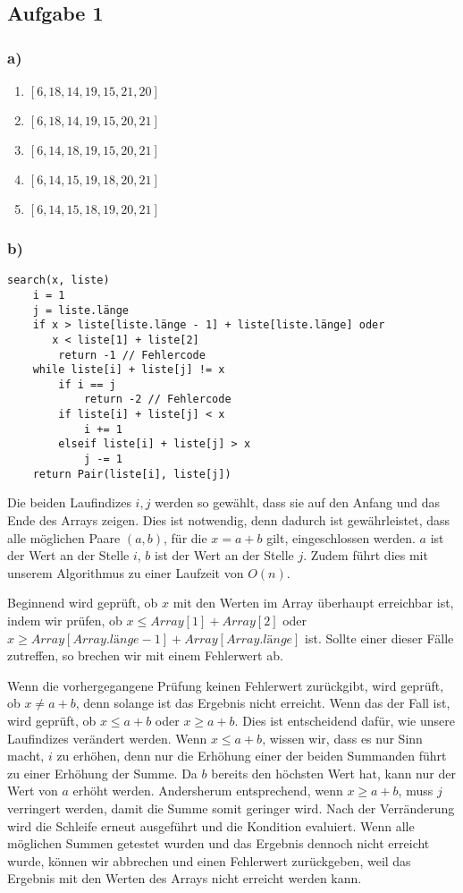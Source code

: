 \documentclass[a4paper,fleqn]{scrartcl}
\begin{document}
\subsection*{Aufgabe 1}
\subsubsection*{a)}
\begin{enumerate}
\item \([6, 18, 14, 19, 15, 21, 20]\)
\item \([6, 18, 14, 19, 15, 20, 21]\)
\item \([6, 14, 18, 19, 15, 20, 21]\)
\item \([6, 14, 15, 19, 18, 20, 21]\)
\item \([6, 14, 15, 18, 19, 20, 21]\)
\end{enumerate}

\subsubsection*{b)}
\begin{verbatim}
search(x, liste)
    i = 1
    j = liste.länge
    if x > liste[liste.länge - 1] + liste[liste.länge] oder
       x < liste[1] + liste[2]
        return -1 // Fehlercode
    while liste[i] + liste[j] != x
        if i == j
            return -2 // Fehlercode
        if liste[i] + liste[j] < x
            i += 1
        elseif liste[i] + liste[j] > x
            j -= 1
    return Pair(liste[i], liste[j])
\end{verbatim}

Die beiden Laufindizes \(i, j\) werden so gewählt, dass sie auf den Anfang und das Ende
des Arrays zeigen. Dies ist notwendig, denn dadurch ist gewährleistet, dass alle
möglichen Paare \((a, b)\), für die \(x = a + b\) gilt, eingeschlossen werden.
\(a\) ist der Wert an der Stelle \(i\), \(b\) ist der Wert an der Stelle \(j\).
Zudem führt dies mit unserem Algorithmus zu einer Laufzeit von \(O(n)\).

Beginnend wird geprüft, ob \(x\) mit den Werten im Array überhaupt erreichbar 
ist, indem wir prüfen, ob \(x \leq Array[1] + Array[2]\) oder \(x \geq Array
[Array.länge - 1] + Array[Array.länge]\) ist. Sollte einer dieser Fälle zutreffen, 
so brechen wir mit einem Fehlerwert ab.

Wenn die vorhergegangene Prüfung keinen Fehlerwert zurückgibt,
wird geprüft, ob \(x \not= a + b\), denn solange ist das Ergebnis nicht erreicht.
Wenn das der Fall ist, wird geprüft, ob \(x \leq a + b\) oder \(x \geq a + b\).
Dies ist entscheidend dafür, wie unsere Laufindizes verändert werden. Wenn
\(x \leq a + b\), wissen wir, dass es nur Sinn macht, \(i\) zu erhöhen, denn
nur die Erhöhung einer der beiden Summanden führt zu einer Erhöhung der Summe.
Da \(b\) bereits den höchsten Wert hat, kann nur der Wert von \(a\) erhöht werden.
Andersherum entsprechend, wenn \(x \geq a + b\), muss \(j\) verringert werden,
damit die Summe somit geringer wird. Nach der Verränderung wird die Schleife
erneut ausgeführt und die Kondition evaluiert.
Wenn alle möglichen Summen getestet wurden und das Ergebnis dennoch nicht erreicht wurde,
können wir abbrechen und einen Fehlerwert zurückgeben, weil das Ergebnis mit 
den Werten des Arrays nicht erreicht werden kann.
\end{document}
